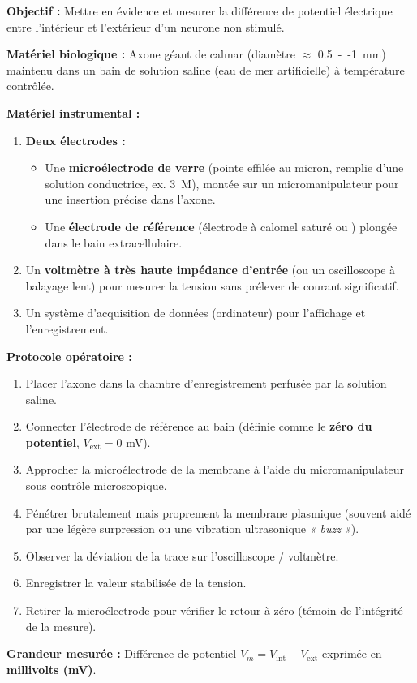 \documentclass[11pt]{article}
\begin{document}
\begin{methode}
\textbf{Objectif :} Mettre en évidence et mesurer la différence de potentiel électrique entre l'intérieur et l'extérieur d'un neurone non stimulé.

\textbf{Matériel biologique :} Axone géant de calmar (diamètre $\approx$ \SI{0,5}{--}\SI{1}{mm}) maintenu dans un bain de solution saline (eau de mer artificielle) à température contrôlée.

\textbf{Matériel instrumental :}
\begin{enumerate}
    \item \textbf{Deux électrodes :}
    \begin{itemize}
        \item Une \textbf{microélectrode de verre} (pointe effilée au micron, remplie d'une solution conductrice, ex.  \SI{3}{M}), montée sur un micromanipulateur pour une insertion précise dans l'axone.
        \item Une \textbf{électrode de référence} (électrode à calomel saturé ou ) plongée dans le bain extracellulaire.
    \end{itemize}
    \item Un \textbf{voltmètre à très haute impédance d'entrée} (ou un oscilloscope à balayage lent) pour mesurer la tension sans prélever de courant significatif.
    \item Un système d'acquisition de données (ordinateur) pour l'affichage et l'enregistrement.
\end{enumerate}

\textbf{Protocole opératoire :}
\begin{enumerate}
    \item Placer l'axone dans la chambre d'enregistrement perfusée par la solution saline.
    \item Connecter l'électrode de référence au bain (définie comme le \textbf{zéro du potentiel}, $V_{\text{ext}} = 0$ mV).
    \item Approcher la microélectrode de la membrane à l'aide du micromanipulateur sous contrôle microscopique.
    \item Pénétrer brutalement mais proprement la membrane plasmique (souvent aidé par une légère surpression ou une vibration ultrasonique \emph{« buzz »}).
    \item Observer la déviation de la trace sur l'oscilloscope / voltmètre.
    \item Enregistrer la valeur stabilisée de la tension.
    \item Retirer la microélectrode pour vérifier le retour à zéro (témoin de l'intégrité de la mesure).
\end{enumerate}

\textbf{Grandeur mesurée :} Différence de potentiel $V_m = V_{\text{int}} - V_{\text{ext}}$ exprimée en \textbf{millivolts (mV)}.
\end{methode}
\end{document}
